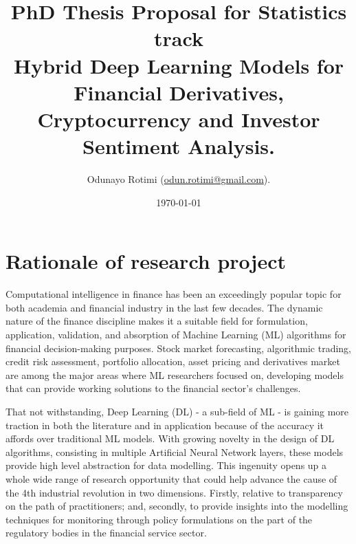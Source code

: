\documentclass[a4paper,11pt]{scrartcl}
\title{PhD Thesis Proposal for Statistics track  \\  
    \large Hybrid Deep Learning Models for Financial Derivatives, 
Cryptocurrency and Investor Sentiment Analysis.}
\author{Odunayo Rotimi (\url{odun.rotimi@gmail.com}).}
\date{\today}
\begin{document}
\maketitle


%
\section{Rationale of research project}
Computational intelligence in finance has been an exceedingly popular topic for both academia and financial
industry in the last few decades. The dynamic nature of the finance discipline makes it a suitable field for
formulation, application, validation, and absorption of Machine Learning (ML) algorithms for financial
decision-making purposes. Stock market forecasting, algorithmic trading, credit risk assessment,
portfolio allocation, asset pricing and derivatives market are among the major areas where ML researchers
focused on, developing models that can provide working solutions to the financial sector's challenges.
\newline

That not withstanding, Deep Learning (DL) - a sub-field of ML - is gaining more traction in both the
literature and in application because of the accuracy it affords over traditional ML models. With growing
novelty in the design of DL algorithms, consisting in multiple Artificial Neural Network layers, these models provide high level
abstraction for data modelling. This ingenuity opens up a whole wide range of research opportunity that
could help advance the cause of the 4th industrial revolution in two dimensions. Firstly, relative to
transparency on the path of practitioners; and, secondly, to provide insights into the modelling techniques
for monitoring through policy formulations on the part of the regulatory bodies in the financial service sector.


%
\end{document}
